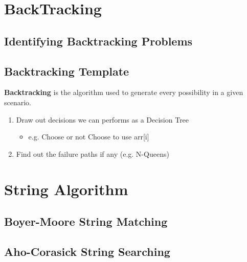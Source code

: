 \documentclass{article}
\begin{document}
\section{BackTracking}

\subsection{Identifying Backtracking Problems}

\subsection{Backtracking Template}

\textbf{Backtracking} is the algorithm used to generate every possibility in a given scenario. 

\begin{enumerate}
	\item Draw out decisions we can performs as a Decision Tree
		\begin{itemize}
			\item e.g. Choose or not Choose to use arr[i]
		\end{itemize}
	\item Find out the failure paths if any (e.g. N-Queens)
\end{enumerate}

\section{String Algorithm}

\subsection{Boyer-Moore String Matching}

\subsection{Aho-Corasick String Searching}
\end{document}
